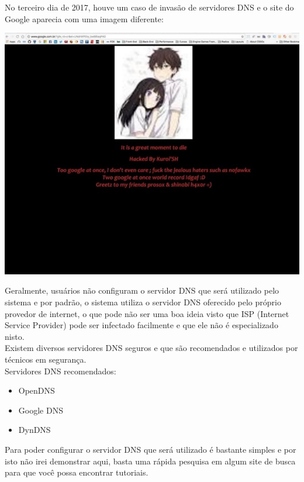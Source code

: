 \documentclass[12pt, letterpaper, Monospace:12]{report}
\begin{document}
	No terceiro dia de 2017, houve um caso de invasão de servidores DNS e o site do Google aparecia com uma imagem diferente:

\begin{center} %
	\includegraphics[scale=0.7]{dns.jpg}\\
\end{center}

	Geralmente, usuários não configuram o servidor DNS que será utilizado pelo sistema e por padrão, o sistema utiliza o servidor DNS oferecido pelo próprio provedor de internet, o que pode não ser uma boa ideia visto que ISP (Internet Service Provider) pode ser infectado facilmente e que ele não é especializado nisto.\\


	Existem diversos servidores DNS seguros e que são recomendados e utilizados por técnicos em segurança.\\

	Servidores DNS recomendados:

	\begin{itemize} %
		\item OpenDNS
		\item Google DNS
		\item DynDNS
%
	\end{itemize} %

	Para poder configurar o servidor DNS que será utilizado é bastante simples e por isto não irei demonstrar aqui, basta uma rápida pesquisa em algum site de busca para que você possa encontrar tutoriais.\\
\end{document}
